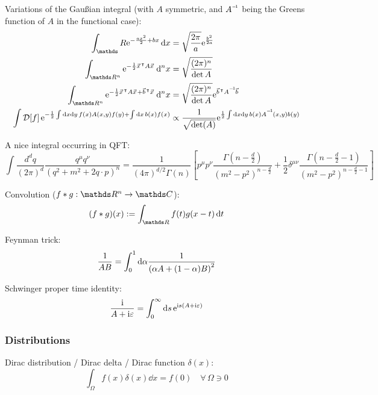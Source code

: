 			\noindent
			Variations of the Gaußian integral (with $A$ symmetric, and $\inv{A}$ being the Greens function of $A$ in the functional case):
			\begin{equation}
				\begin{aligned}
					\int_\reals \ex^{-\frac{a x^2}{2}+ b x}\dd{x} &= \sqrt{\frac{2\pi}{a}} \ex^{\frac{b^2}{2 a}}\\
					\int_{\reals ^n} \ex^{-\frac{1}{2} \vec{x}^\trp A \vec{x}}\dd[n]{x}
					&= \sqrt{\frac{(2\pi)^n}{\det A}}\\
					\int_{\reals ^n} \ex^{-\frac{1}{2} \vec{x}^\trp A \vec{x} + \vec{b}^\trp \vec{x}}\dd[n]{x}
					&= \sqrt{\frac{(2\pi)^n}{\det A}} \ex^{\vec{b}^\trp \inv{A} \vec{b}}\\
					\int \mathcal{D}\qty[f]\, \ex^{-\frac{1}{2} \int \dd x \dd y \, f(x) A(x, y) f(y) + \int \dd x\,b(x)f(x)}
					&\propto \frac{1}{\sqrt{\det(A)}}\ex^{\frac{1}{2} \int \dd x \dd y \, b(x) \inv{A}(x,y) b(y)}
				\end{aligned}
			\end{equation}

			\noindent
			A nice integral occurring in QFT:
			\begin{equation}
				\int\frac{d^{d}q}{(2\pi)^{d}}\frac{q^{\mu}q^{\nu}}{(q^{2}+m^{2}+2q\cdot p)^{n}}=\frac{1}{(4\pi)^{d/2}\Gamma(n)}\left[p^{\mu}p^{\nu}\frac{\Gamma(n-\frac{d}{2})}{(m^{2}-p^{2})^{n-\frac{d}{2}}}+\frac{1}{2}\delta^{\mu\nu}\frac{\Gamma(n-\frac{d}{2}-1)}{(m^{2}-p^{2})^{n-\frac{d}{2}-1}}\right]
			\end{equation}

			\noindent
			Convolution ($f*g:\reals ^n \to \complex $):
			\begin{equation}
				(f*g)(x) := \int_{\reals} f(t) g(x-t)\dd{t}
			\end{equation}

			\noindent
			Feynman trick:
			\begin{equation}
				\frac{1}{AB} = \int_0^1 \dd\alpha \frac{1}{\qty(\alpha A + (1-\alpha)B)^2}
			\end{equation}

			\noindent
			Schwinger proper time identity:
			\begin{equation}
				\frac{\mathrm{i}}{A+\mathrm{i} \varepsilon} = \int_0^\infty \dd{s} \mathrm{e}^{\mathrm{i} s( A + \mathrm{i} \varepsilon)}
			\end{equation}

		\subsubsection{Distributions}
			\noindent
			Dirac distribution / Dirac delta / Dirac function $\delta(x)$:
			\begin{equation}
				\int_\Omega f(x)\delta(x)\dd{x} = f(0)\quad\forall\, \Omega\ni 0
			\end{equation}

